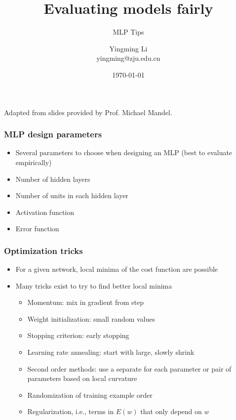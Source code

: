 \documentclass[12pt,notes,mathserif]{beamer}
\title[]{Evaluating models fairly}
\subtitle{\Large MLP Tips}
\author[YingmingLi]{Yingming Li \\ yingming@zju.edu.cn}
\institute[DSERC, ZJU]{Data Science \& Engineering Research Center, ZJU}
\date[\today]{\today}
\begin{document}

\begin{frame}[c]
	\titlepage
	\begin{center}
		Adapted from slides provided by Prof.  Michael Mandel.
	\end{center}
\end{frame}

\begin{frame}[c]
	\frametitle{MLP design parameters}
	\begin{itemize}
		\item  Several parameters to choose when designing an MLP (best to evaluate empirically)
		\item Number of hidden layers
		\item Number of units in each hidden layer
		\item Activation function
		\item Error function
	\end{itemize}
\end{frame}
\begin{frame}[c]
	\frametitle{Optimization tricks}
	\begin{itemize}
		\item  For a given network, local minima of the cost function are possible
		\item  Many tricks exist to try to find better local minima
		      \begin{itemize}
			      \item Momentum: mix in gradient from step

			      \item Weight initialization: small random values

			      \item  Stopping criterion: early stopping

			      \item Learning rate annealing: start with large, slowly shrink

			      \item Second order methods: use a separate for each parameter or pair of parameters based on local curvature

			      \item Randomization of training example order

			      \item Regularization, i.e., terms in $E(w)$ that only depend on $w$

		      \end{itemize}

	\end{itemize}

\end{frame}
\end{document}
